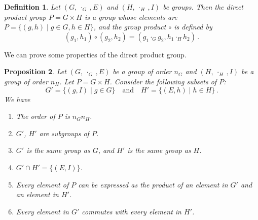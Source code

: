\documentclass{article}
\theoremstyle{plain}\theoremheaderfont{\normalfont\itshape}\theorembodyfont{\rmfamily}\theoremseparator{.}\newtheorem*{rem}{Remark}\newtheorem*{ex}{Example}\newtheorem*{proof}{Proof}\newtheorem*{altp}{Alternative proof}
\theoremstyle{plain}\theoremheaderfont{\normalfont\bfseries}\theorembodyfont{\rmfamily}\theoremseparator{.}\newtheorem{thm}{Theorem}[section]\newtheorem{lem}[thm]{Lemma}\newtheorem{prop}[thm]{Proposition}\newtheorem*{cor}{Corollary}\newtheorem{defn}[thm]{Definition}\newtheorem{clm}[thm]{Claim}\newtheorem{clminproof}{Claim}\newtheorem*{law}{Law}\newtheorem{pos}[thm]{Postulate}
\theoremstyle{break}\theoremheaderfont{\normalfont\itshape}\theorembodyfont{\rmfamily}\theoremseparator{.\medskip}\newtheorem*{proofskip}{Proof}\newtheorem*{exs}{Examples}\newtheorem*{rems}{Remarks}
\theoremstyle{break}\theoremheaderfont{\normalfont\bfseries}\theorembodyfont{\rmfamily}\theoremseparator{.\medskip}\newtheorem{lemskip}[thm]{Lemma}\newtheorem{defnskip}[thm]{Definition}\newtheorem{propskip}[thm]{Proposition}\newtheorem{thmskip}[thm]{Theorem}
\numberwithin{equation}{section}
\begin{document}
    \begin{defn}
        Let \((G,\ \cdot_G\ ,E)\) and \((H,\ \cdot_H \ ,I)\) be groups. Then the \textit{direct product group} \(P=G\times H\) is a group whose elements are \(P=\{(g,h)\mid g\in G,h\in H\}\), and the group product \(\circ\) is defined by
        \begin{equation}
            (g_1,h_1)\circ(g_2,h_2)=(g_1\cdot_G g_2,h_1\cdot_H h_2)\,.
        \end{equation}
    \end{defn}
    We can prove some properties of the direct product group.
    \begin{prop}
        Let \((G,\ \cdot_G\ ,E)\) be a group of order \(n_G\) and \((H,\ \cdot_H\ ,I)\) be a group of order \(n_H\). Let \(P=G\times H\). Consider the following subsets of \(P\):
        \begin{equation}
            G'=\{(g,I)\mid g\in G\}\quad\text{and}\quad H'=\{(E,h)\mid h\in H\}\,.
        \end{equation}
        We have
        \begin{enumerate}[topsep=0pt,label=(\roman*)]
            \item The order of \(P\) is \(n_G n_H\).
            \item \(G'\), \(H'\) are subgroups of \(P\).
            \item \(G'\) is the same group as \(G\), and \(H'\) is the same group as \(H\).
            \item \(G'\cap H'=\{(E,I)\}\).
            \item Every element of \(P\) can be expressed as the product of an element in \(G'\) and an element in \(H'\).
            \item Every element in \(G'\) commutes with every element in \(H'\).
        \end{enumerate}
    \end{prop}
\end{document}

